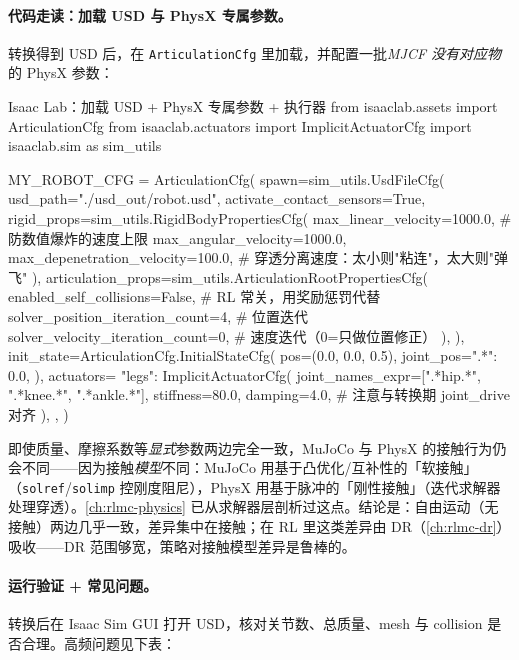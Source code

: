 \paragraph{代码走读：加载 USD 与 PhysX 专属参数。}转换得到 USD 后，在 \texttt{ArticulationCfg} 里加载，并配置一批\emph{MJCF 没有对应物}的 PhysX 参数：

\begin{codebox}[Python]{Isaac Lab：加载 USD + PhysX 专属参数 + 执行器}
from isaaclab.assets import ArticulationCfg
from isaaclab.actuators import ImplicitActuatorCfg
import isaaclab.sim as sim_utils

MY_ROBOT_CFG = ArticulationCfg(
    spawn=sim_utils.UsdFileCfg(
        usd_path="./usd_out/robot.usd",
        activate_contact_sensors=True,
        rigid_props=sim_utils.RigidBodyPropertiesCfg(
            max_linear_velocity=1000.0,        # 防数值爆炸的速度上限
            max_angular_velocity=1000.0,
            max_depenetration_velocity=100.0,  # 穿透分离速度：太小则"粘连"，太大则"弹飞"
        ),
        articulation_props=sim_utils.ArticulationRootPropertiesCfg(
            enabled_self_collisions=False,     # RL 常关，用奖励惩罚代替
            solver_position_iteration_count=4, # 位置迭代
            solver_velocity_iteration_count=0, # 速度迭代（0=只做位置修正）
        ),
    ),
    init_state=ArticulationCfg.InitialStateCfg(
        pos=(0.0, 0.0, 0.5), joint_pos={".*": 0.0},
    ),
    actuators={
        "legs": ImplicitActuatorCfg(
            joint_names_expr=[".*hip.*", ".*knee.*", ".*ankle.*"],
            stiffness=80.0, damping=4.0,       # 注意与转换期 joint_drive 对齐
        ),
    },
)
\end{codebox}

\begin{insight}\label{ins:rlmc-assets-contact-models}
即使质量、摩擦系数等\emph{显式}参数两边完全一致，MuJoCo 与 PhysX 的接触行为仍会不同——因为接触\emph{模型}不同：MuJoCo 用基于凸优化/互补性的「软接触」（\texttt{solref}/\texttt{solimp} 控刚度阻尼），PhysX 用基于脉冲的「刚性接触」（迭代求解器处理穿透）。\cref{ch:rlmc-physics} 已从求解器层剖析过这点。结论是：自由运动（无接触）两边几乎一致，差异集中在接触；在 RL 里这类差异由 DR（\cref{ch:rlmc-dr}）吸收——DR 范围够宽，策略对接触模型差异是鲁棒的。
\end{insight}

\paragraph{运行验证 + 常见问题。}转换后在 Isaac Sim GUI 打开 USD，核对关节数、总质量、mesh 与 collision 是否合理。高频问题见下表：


